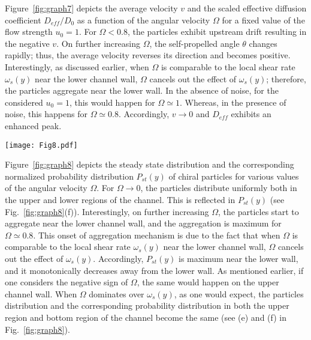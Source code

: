 \documentclass[aps,pre,preprint,superscriptaddress,amsmath,amssymb,nofootinbib]{revtex4}
\begin{document}
Figure~\ref{fig:graph7} depicts the average velocity $v$ and the scaled  effective diffusion coefficient $D_{eff}/D_0$ as a function of the angular velocity $\Omega$ for a fixed value of the flow strength $u_0 = 1$.
For $\Omega < 0.8$, the particles exhibit upstream drift resulting in the negative $v$. 
On further increasing $\Omega$, the self-propelled angle $\theta$ changes rapidly; thus, the average velocity reverses its direction and becomes positive. 
Interestingly, as discussed earlier, when $\Omega$ is comparable to the local shear rate $\omega_s(y)$ near the lower channel wall, $\Omega$ cancels out the effect of $\omega_s(y)$; therefore, the particles aggregate near the lower wall. 
In the absence of noise, for the considered $u_0 = 1$, this would happen for $\Omega \simeq 1$. 
Whereas, in the presence of noise, this happens for $\Omega \simeq 0.8$. 
Accordingly, $v \to 0$ and $D_{eff}$ exhibits an enhanced peak.

\begin{figure*}[hbt!]
\centering
\texttt{[image: Fig8.pdf]}
\caption{The steady state distribution of chiral particles, for various values of the angular velocity $\Omega$, is depicted in (a)-(e). 
The corresponding normalized probability distributions $P_{st}(y)$ along the $y-$direction are depicted in (f).	
The set parameters are $D_\theta = D_0 = 0.1$ and $u_0 = 1$.}
\label{fig:graph8}
\end{figure*}

Figure~\ref{fig:graph8} depicts the steady state distribution and the corresponding normalized probability distribution $P_{st}(y)$ of chiral particles for various values of the angular velocity $\Omega$. 
For $\Omega \rightarrow 0$, the particles distribute uniformly both in the upper and lower regions of the channel. 
This is reflected in $P_{st}(y)$ (see Fig.~\ref{fig:graph8}(f)). 
Interestingly, on further increasing $\Omega$, the particles start to aggregate near the lower channel wall, and the aggregation is maximum for $\Omega \simeq 0.8$.
This onset of aggregation mechanism is due to the fact that when $\Omega$ is comparable to the local shear rate $\omega_s(y)$ near the lower channel wall, $\Omega$ cancels out the effect of $\omega_s(y)$.
Accordingly, $P_{st}(y)$ is maximum near the lower wall, and it monotonically decreases away from the lower wall.
As mentioned earlier, if one considers the negative sign of $\Omega$, the same would happen on the upper channel wall. 
When $\Omega$ dominates over $\omega_s(y)$, as one would expect, the particles distribution and the corresponding probability distribution in both the upper region and bottom region of the channel become the same (see (e) and (f) in Fig.~\ref{fig:graph8}).
\end{document}
